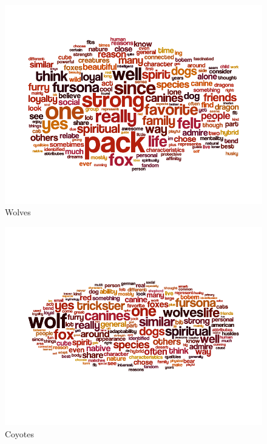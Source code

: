 \begin{figure}
  \begin{center}
    \includegraphics[width=\textwidth]{content/assets/species-2--wolf}
  \end{center}
  \caption{Wolves}
\end{figure}

\begin{figure}
  \begin{center}
    \includegraphics[width=\textwidth]{content/assets/species-2--coyote}
  \end{center}
  \caption{Coyotes}
\end{figure}

